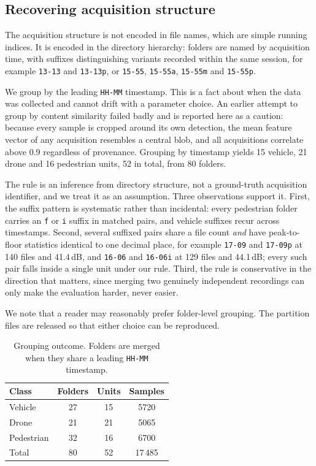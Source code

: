 \documentclass[conference]{IEEEtran}
\begin{document}
\subsection{Recovering acquisition structure}

The acquisition structure is not encoded in file names, which are simple
running indices. It is encoded in the directory hierarchy: folders are named
by acquisition time, with suffixes distinguishing variants recorded within
the same session, for example \texttt{13-13} and \texttt{13-13p}, or
\texttt{15-55}, \texttt{15-55a}, \texttt{15-55m} and \texttt{15-55p}.

We group by the leading \texttt{HH-MM} timestamp. This is a fact about when
the data was collected and cannot drift with a parameter choice. An earlier
attempt to group by content similarity failed badly and is reported here as a
caution: because every sample is cropped around its own detection, the mean
feature vector of any acquisition resembles a central blob, and all
acquisitions correlate above 0.9 regardless of provenance. Grouping by
timestamp yields 15 vehicle, 21 drone and 16 pedestrian units, 52 in total,
from 80 folders.

The rule is an inference from directory structure, not a ground-truth
acquisition identifier, and we treat it as an assumption. Three observations
support it. First, the suffix pattern is systematic rather than incidental:
every pedestrian folder carries an \texttt{f} or \texttt{i} suffix in
matched pairs, and vehicle suffixes recur across timestamps. Second, several
suffixed pairs share a file count \emph{and} have peak-to-floor statistics
identical to one decimal place, for example \texttt{17-09} and
\texttt{17-09p} at 140 files and 41.4\,dB, and \texttt{16-06} and
\texttt{16-06i} at 129 files and 44.1\,dB; every such pair falls inside a
single unit under our rule. Third, the rule is conservative in the direction
that matters, since merging two genuinely independent recordings can only
make the evaluation harder, never easier.

We note that a reader may reasonably prefer folder-level grouping. The
partition files are released so that either choice can be reproduced.

\begin{table}[t]
\caption{Grouping outcome. Folders are merged when they share a leading
\texttt{HH-MM} timestamp.}
\label{tab:grouping}
\centering
\small
\setlength{\tabcolsep}{4pt}
\begin{tabular}{lccc}
\toprule
Class & Folders & Units & Samples \\
\midrule
Vehicle    & 27 & 15 & 5720 \\
Drone      & 21 & 21 & 5065 \\
Pedestrian & 32 & 16 & 6700 \\
\midrule
Total      & 80 & 52 & 17\,485 \\
\bottomrule
\end{tabular}
\end{table}
\end{document}
